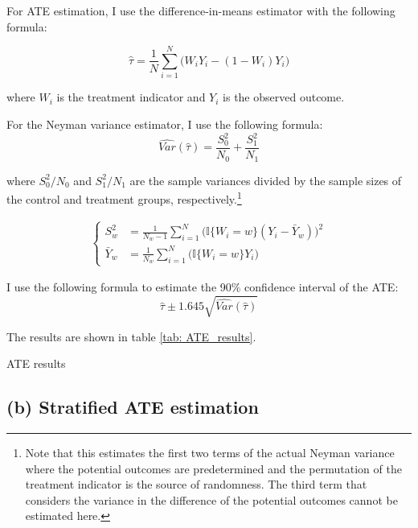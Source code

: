 \documentclass[11pt]{article}
\numberwithin{equation}{section}
\begin{document}
For ATE estimation, I use the difference-in-means estimator with the following formula:

\begin{equation}
    \hat{\tau} = \frac{1}{N} \sum_{i=1}^N \bigl(W_iY_i - (1-W_i)Y_i\bigr)\label{eq:ATE_dim}
\end{equation}

where $W_i$ is the treatment indicator and $Y_i$ is the observed outcome.

For the Neyman variance estimator, I use the following formula:
\begin{equation}
    \hat{Var}(\hat{\tau}) = \frac{S_0^2}{N_0} + \frac{S_1^2}{N_1}\label{eq:neyman_var}
\end{equation}

where $S_0^2/N_0$ and $S_1^2/N_1$ are the sample variances divided by the sample sizes of the control and treatment groups, respectively.\footnote{Note that this estimates the first two terms of the actual Neyman variance where the potential outcomes are predetermined and the permutation of the treatment indicator is the source of randomness. The third term that considers the variance in the difference of the potential outcomes cannot be estimated here.}

\begin{align}
    \begin{cases}
    S_w^2 &= \frac{1}{N_w-1} \sum_{i=1}^N \bigl(\mathbb{I}\{W_i=w\}(Y_i - \bar{Y}_w)\bigr)^2\\
    \bar{Y}_w &= \frac{1}{N_w} \sum_{i=1}^N \bigl(\mathbb{I}\{W_i=w\}Y_i\bigr)
    \end{cases}
\end{align}

I use the following formula to estimate the 90\% confidence interval of the ATE:
\begin{equation}
    \hat{\tau} \pm 1.645 \sqrt{\hat{Var}(\hat{\tau})}\label{eq:ci}
\end{equation}

The results are shown in table \ref{tab: ATE_results}.

\begin{table}[h]
    \centering
    
    \caption{\label{tab: ATE_results}ATE results}
\end{table}



\subsection*{(b) Stratified ATE estimation}
\end{document}
